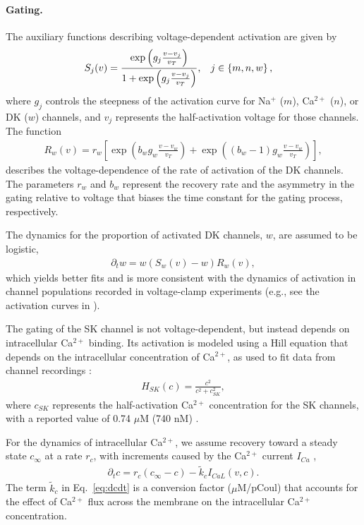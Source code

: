 \documentclass[10pt,letterpaper]{article}
\newcommand{\Ca}{Ca$^{2+}$}
\newcommand{\Na}{Na$^{+}$}
\newcommand{\lrSquare}[1]{\left[#1\right]}
\newcommand{\lrSet}[1]{\left\{#1\right\}}
\begin{document}
\paragraph{Gating.} 
The auxiliary functions describing voltage-dependent activation are given by
\begin{align}
S_j(v) &= \frac{\textrm{exp}\left(g_j \frac{v-v_j}{v_T} \right)}{1 + \textrm{exp}\left(g_j \frac{v-v_j}{v_T} \right)}, \hspace{0.3cm} j \in \lrSet{m,n,w}, 
\label{eq:gating}
\end{align}
where $g_j$ controls the steepness of the activation curve for {\Na} ($m$), {\Ca} ($n$), or DK ($w$) channels, and $v_j$ represents the half-activation voltage for those channels. 
The function
\begin{eqnarray}
\label{eq:actRate}
    R_w(v) = r_w \lrSquare{ \exp \left(b_w g_w\frac{v-v_w}{v_T}\right) + \exp \left((b_w-1)g_w\frac{v-v_w}{v_T}\right)},
\end{eqnarray}  
describes the voltage-dependence of the rate of activation of the DK channels. The parameters  $r_w$ and $b_w$ represent the recovery rate  and  the asymmetry in the gating relative to voltage that biases the time constant for the gating process, respectively. 

The dynamics for the proportion of activated DK channels, $w$,  are assumed to be logistic,
\begin{eqnarray}
\label{eq:dwdt}
\partial_t{w} = w (S_w(v)-w)  R_w(v), 
\end{eqnarray}
which yields better fits and is more consistent with the dynamics of activation in channel populations recorded in voltage-clamp experiments (e.g., see the activation curves in  \cite{Covarrubiasetal1991,hodgkin1952quantitative,TsunodaSalkoff1995b}).

The gating of the SK channel is not voltage-dependent, but instead depends on intracellular {\Ca} binding. Its activation is modeled using a Hill equation that depends on the intracellular concentration of {\Ca}, as used to fit data from channel recordings \cite{hirschberg1998gating}:
\begin{eqnarray}
H_{SK}(c) = \frac{c^2}{c^2 + c_{SK}^2},
\end{eqnarray}
where $c_{SK}$ represents the half-activation {\Ca} concentration for the SK channels, with a reported value of 0.74 $\mu$M (740 nM) \cite{hirschberg1998gating,stocker20042+}.

For the dynamics of intracellular {\Ca}, we assume recovery toward a steady state $c_{\infty}$ at a rate $r_c$, with increments caused by the {\Ca} current $I_{Ca}$ \cite{avron1991minimal},
\begin{eqnarray}
\partial_t{c} = r_{c}({c_{\infty} - c}) - \tilde{k}_{c} I_{CaL}(v,c).
\label{eq:dcdt}
\end{eqnarray}
The term $\tilde{k}_c$ in Eq.~\eqref{eq:dcdt} is a conversion factor ($\mu$M/pCoul) that accounts for the effect of {\Ca} flux across the membrane on the intracellular {\Ca} concentration. 
\end{document}
